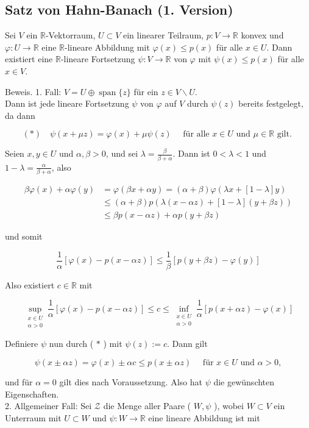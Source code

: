 \documentclass[10pt, letterpaper]{article}
\begin{document}
\subsection*{Satz von Hahn-Banach (1. Version)}
Sei $V$ ein $\mathbb{R}$-Vektorraum, $U \subset V$ ein linearer Teilraum, $p: V \rightarrow \mathbb{R}$ konvex und $\varphi: U \rightarrow \mathbb{R}$ eine $\mathbb{R}$-lineare Abbildung mit $\varphi(x) \leq p(x)$ für alle $x \in U$. Dann existiert eine $\mathbb{R}$-lineare Fortsetzung $\psi: V \rightarrow \mathbb{R}$ von $\varphi$ mit $\psi(x) \leq p(x)$ für alle $x \in V$.

Beweis. 1. Fall: $V=U \oplus \operatorname{span}\{z\}$ für ein $z \in V \backslash U$.\\
Dann ist jede lineare Fortsetzung $\psi$ von $\varphi$ auf $V$ durch $\psi(z)$ bereits festgelegt, da dann

$$
(*) \quad \psi(x+\mu z)=\varphi(x)+\mu \psi(z) \quad \text { für alle } x \in U \text { und } \mu \in \mathbb{R} \text { gilt. }
$$

Seien $x, y \in U$ und $\alpha, \beta>0$, und sei $\lambda=\frac{\beta}{\beta+\alpha}$. Dann ist $0<\lambda<1$ und $1-\lambda=\frac{\alpha}{\beta+\alpha}$, also

$$
\begin{aligned}
\beta \varphi(x)+\alpha \varphi(y) & =\varphi(\beta x+\alpha y)=(\alpha+\beta) \varphi(\lambda x+[1-\lambda] y) \\
& \leq(\alpha+\beta) p(\lambda(x-\alpha z)+[1-\lambda](y+\beta z)) \\
& \leq \beta p(x-\alpha z)+\alpha p(y+\beta z)
\end{aligned}
$$

und somit

$$
\frac{1}{\alpha}[\varphi(x)-p(x-\alpha z)] \leq \frac{1}{\beta}[p(y+\beta z)-\varphi(y)]
$$

Also existiert $c \in \mathbb{R}$ mit

$$
\sup _{\substack{x \in U \\ \alpha>0}} \frac{1}{\alpha}[\varphi(x)-p(x-\alpha z)] \leq c \leq \inf _{\substack{x \in U \\ \alpha>0}} \frac{1}{\alpha}[p(x+\alpha z)-\varphi(x)]
$$

Definiere $\psi$ nun durch ( $*$ ) mit $\psi(z):=c$. Dann gilt

$$
\psi(x \pm \alpha z)=\varphi(x) \pm \alpha c \leq p(x \pm \alpha z) \quad \text { für } x \in U \text { und } \alpha>0,
$$

und für $\alpha=0$ gilt dies nach Voraussetzung. Also hat $\psi$ die gewünschten Eigenschaften.\\
2. Allgemeiner Fall: Sei $\mathcal{Z}$ die Menge aller Paare ( $W, \psi$ ), wobei $W \subset V$ ein Unterraum mit $U \subset W$ und $\psi: W \rightarrow \mathbb{R}$ eine lineare Abbildung ist mit
\end{document}
